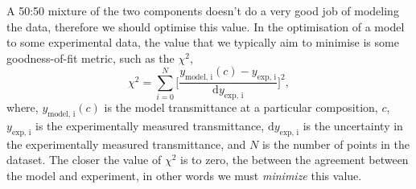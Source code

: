 \documentclass[a4paper]{article}
\begin{document}
\vspace{\baselineskip}
\begin{center}
	\noindent{}
\end{center}

A 50:50 mixture of the two components doesn't do a very good job of modeling the data, therefore we should optimise this value. 
In the optimisation of a model to some experimental data, the value that we typically aim to minimise is some goodness-of-fit metric, such as the $\chi^2$, 
%
\begin{equation}
  \chi^2 = \sum_{i=0}^{N}\bigg[{\frac{y_{\text{model, i}}(c) - y_{\text{exp, i}}}{\text{d}y_{\text{exp, i}}}\bigg]^2},
  \label{equ:chi}
\end{equation}
%
where, $y_{\text{model, i}}(c)$ is the model transmittance at a particular composition, $c$, $y_{\text{exp, i}}$ is the experimentally measured transmittance, $\text{d}y_{\text{exp, i}}$ is the uncertainty in the experimentally measured transmittance, and $N$ is the number of points in the dataset.
The closer the value of $\chi^2$ is to zero, the between the agreement between the model and experiment, in other words we must \emph{minimize} this value.
\end{document}
